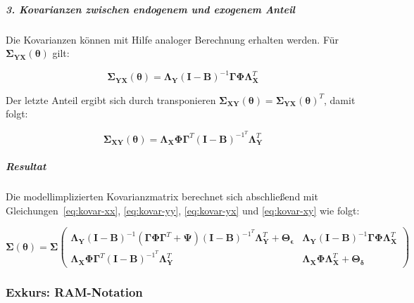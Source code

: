 \documentclass{article}
\numberwithin{equation}{section}
\begin{document}
\subparagraph*{3. Kovarianzen zwischen endogenem und exogenem Anteil}

Die Kovarianzen können mit Hilfe analoger Berechnung erhalten werden. Für $\boldsymbol\Sigma_{\mathbf{YX}}(\boldsymbol\theta)$ gilt:

\begin{equation}
\label{eq:kovar-yx}
\boldsymbol\Sigma_{\mathbf{YX}}(\boldsymbol\theta) = \boldsymbol\Lambda_{\mathbf{Y}} (\mathbf{I} - \mathbf{B})^{-1} \boldsymbol\Gamma \boldsymbol\Phi \boldsymbol\Lambda_{\mathbf{X}}^T
\end{equation}

Der letzte Anteil ergibt sich durch transponieren $\boldsymbol\Sigma_{\mathbf{XY}}(\boldsymbol\theta) = \boldsymbol\Sigma_{\mathbf{YX}}(\boldsymbol\theta)^T$, damit folgt:

\begin{equation}
\label{eq:kovar-xy}
\boldsymbol\Sigma_{\mathbf{XY}}(\boldsymbol\theta) = \boldsymbol\Lambda_{\mathbf{X}} \boldsymbol\Phi \boldsymbol\Gamma^T (\mathbf{I} - \mathbf{B})^{{-1}^T} \boldsymbol\Lambda_{\mathbf{Y}}^T
\end{equation}

\subparagraph*{Resultat}

Die modellimplizierten Kovarianzmatrix berechnet sich abschließend mit Gleichungen~\ref{eq:kovar-xx}, \ref{eq:kovar-yy}, \ref{eq:kovar-yx} und \ref{eq:kovar-xy} wie folgt:

\begin{equation}
\boldsymbol{\Sigma(\theta)} = \boldsymbol\Sigma
\begin{pmatrix}
\boldsymbol\Lambda_{\mathbf{Y}} (\mathbf{I} - \mathbf{B})^{-1} (\boldsymbol\Gamma \boldsymbol\Phi \boldsymbol\Gamma^T + \boldsymbol\Psi) (\mathbf{I} - \mathbf{B})^{{-1}^T} \boldsymbol\Lambda_{\mathbf{Y}}^T + \boldsymbol\Theta_{\boldsymbol\epsilon}
&
\boldsymbol\Lambda_{\mathbf{Y}} (\mathbf{I} - \mathbf{B})^{-1} \boldsymbol\Gamma \boldsymbol\Phi \boldsymbol\Lambda_{\mathbf{X}}^T
\\
\boldsymbol\Lambda_{\mathbf{X}} \boldsymbol\Phi \boldsymbol\Gamma^T (\mathbf{I} - \mathbf{B})^{{-1}^T} \boldsymbol\Lambda_{\mathbf{Y}}^T
&
\boldsymbol\Lambda_{\mathbf{X}} \boldsymbol\Phi \boldsymbol\Lambda_{\mathbf{X}}^T + \boldsymbol\Theta_{\boldsymbol\delta}
\end{pmatrix}
\end{equation}

\subsubsection{Exkurs: RAM-Notation}
\end{document}
